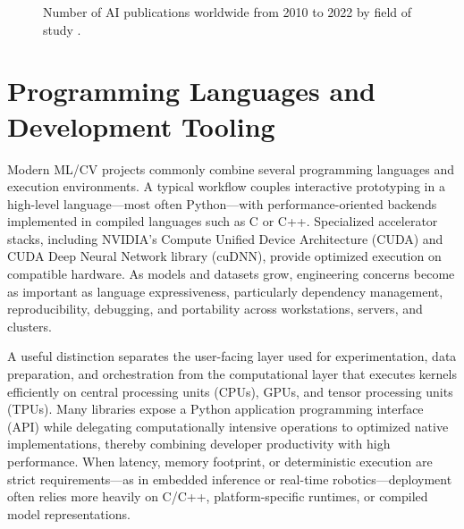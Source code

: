 \documentclass{article}
\newcounter{entry}[section]
\begin{document}
\begin{figure}[tbp]

    \caption{Number of AI publications worldwide from 2010 to 2022 by field of study \cite[p. 33]{maslej2024aiindex}.}
    \label{figure:AI_publications_by_field}
\end{figure}


\section{Programming Languages and Development Tooling}

Modern ML/CV projects commonly combine several programming languages and execution environments. A typical workflow couples interactive prototyping in a high-level language---most often Python---with performance-oriented backends implemented in compiled languages such as C or C++. Specialized accelerator stacks, including NVIDIA's Compute Unified Device Architecture (CUDA) and CUDA Deep Neural Network library (cuDNN), provide optimized execution on compatible hardware. As models and datasets grow, engineering concerns become as important as language expressiveness, particularly dependency management, reproducibility, debugging, and portability across workstations, servers, and clusters.

A useful distinction separates the user-facing layer used for experimentation, data preparation, and orchestration from the computational layer that executes kernels efficiently on central processing units (CPUs), GPUs, and tensor processing units (TPUs). Many libraries expose a Python application programming interface (API) while delegating computationally intensive operations to optimized native implementations, thereby combining developer productivity with high performance. When latency, memory footprint, or deterministic execution are strict requirements---as in embedded inference or real-time robotics---deployment often relies more heavily on C/C++, platform-specific runtimes, or compiled model representations.
\end{document}

